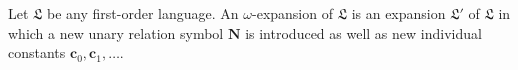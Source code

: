 Let $\mathfrak{L}$ be any first-order language. An $\omega$-expansion of $\mathfrak{L}$ is an expansion $\mathfrak{L}'$ of $\mathfrak{L}$ in which a new unary relation symbol $\mathbf{N}$ is introduced as well as new individual constants $\mathbf{c}_0, \mathbf{c}_1, \ldots$.
